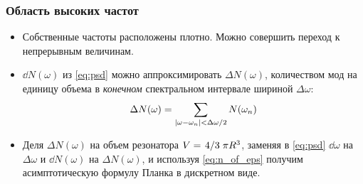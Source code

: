 \documentclass[compress]{beamer}
\begin{document}
    \begin{frame}\frametitle{Область высоких частот}

        \begin{itemize}\justifying

            \item Собственные частоты расположены плотно. Можно совершить переход к непрерывным величинам.

            \item $\dd{N(\omega)}$ из \autoref{eq:psd} можно аппроксимировать $\Delta N(\omega)$, количеством мод на единицу объема в \textit{конечном} спектральном интервале шириной $\Delta \omega$:
            \begin{equation*}
                \Delta N(\omega) = \sum\limits_{
                    \qty|\omega - \omega_n| < \Delta\omega/2
                } N(\omega_n)
            \end{equation*}

            \item Деля $\Delta N(\omega)$ на объем резонатора $V = \flatfrac{4}{3} \pi R^3$, заменяя в \autoref{eq:psd} $\dd{\omega}$ на $\Delta \omega$ и $\dd{N(\omega)}$ на $\Delta N(\omega)$, и используя \autoref{eq:n_of_eps} получим асимптотическую формулу Планка в дискретном виде.

        \end{itemize}

    \end{frame}

\end{document}
